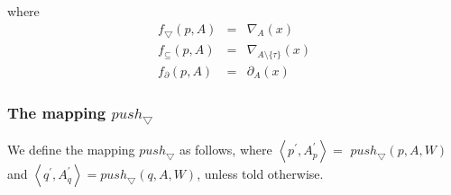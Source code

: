 \documentclass{article}
\begin{document}
where%
\begin{eqnarray*}
f_{\bigtriangledown }(p,A) &=&\nabla _{A}(x) \\
f_{\subseteq }(p,A) &=&\nabla _{A\setminus \{\tau \}}(x) \\
f_{\partial }(p,A) &=&\partial _{A}(x)
\end{eqnarray*}

\newpage

\subsubsection{The mapping $push_{\bigtriangledown }$}

We define the mapping $push_{\bigtriangledown }$ as follows, where $%
\left\langle p^{\prime },A_{p}^{\prime }\right\rangle =$ $%
push_{\bigtriangledown }(p,A,W)$ and $\left\langle q^{\prime },A_{q}^{\prime
}\right\rangle =push_{\bigtriangledown }(q,A,W)$, unless told otherwise.%
\end{document}
